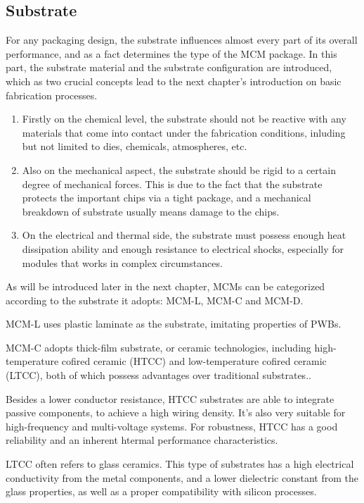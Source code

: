\begin{spacing}{1.5}
\section{Substrate}

For any packaging design, the substrate influences almost every part of its overall performance, and as a fact determines the type of the MCM package. In this part, the substrate material and the substrate configuration are introduced, which as two crucial concepts lead to the next chapter's introduction on basic fabrication processes. 

\begin{enumerate}
    \item Firstly on the chemical level, the substrate should not be reactive with any materials that come into contact under the fabrication conditions, inluding but not limited to dies, chemicals, atmospheres, etc. 
    \item Also on the mechanical aspect, the substrate should be rigid to a certain degree of mechanical forces. This is due to the fact that the substrate protects the important chips via a tight package, and a mechanical breakdown of substrate usually means damage to the chips. 
    \item On the electrical and thermal side, the substrate must possess enough heat dissipation ability and enough resistance to electrical shocks, especially for modules that works in complex circumstances. 
\end{enumerate}

As will be introduced later in the next chapter, MCMs can be categorized according to the substrate it adopts: MCM-L, MCM-C and MCM-D. 

MCM-L uses plastic laminate as the substrate, imitating properties of PWBs. 

MCM-C adopts thick-film substrate, or ceramic technologies, including high-temperature cofired ceramic (HTCC) and low-temperature cofired ceramic (LTCC), both of which possess advantages over traditional substrates.. %

Besides a lower conductor resistance, HTCC substrates are able to integrate passive components, to achieve a high wiring density. It's also very suitable for high-frequency and multi-voltage systems. For robustness, HTCC has a good reliability and an inherent htermal performance characteristics. 

LTCC often refers to glass ceramics. This type of substrates has a high electrical conductivity from the metal components, and a lower dielectric constant from the glass properties, as well as a proper compatibility with silicon processes. 


\end{spacing}
